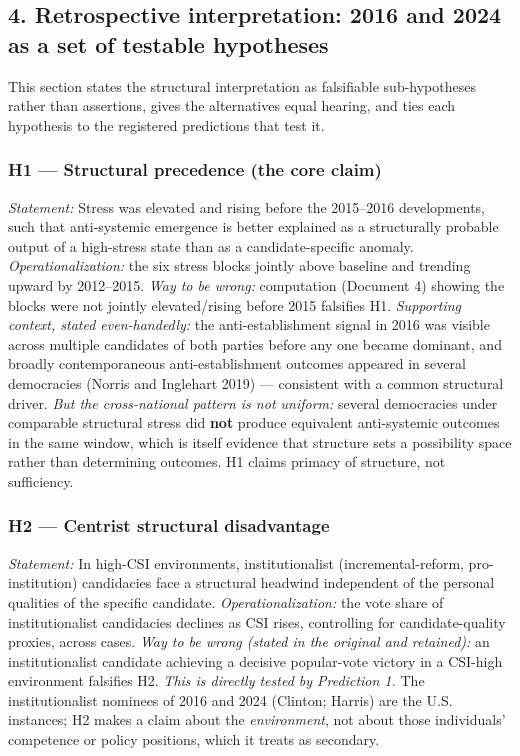 \documentclass[
]{article}
\begin{document}
\subsection{4. Retrospective interpretation: 2016 and 2024 as a set of
testable
hypotheses}\label{retrospective-interpretation-2016-and-2024-as-a-set-of-testable-hypotheses}

This section states the structural interpretation as falsifiable
sub-hypotheses rather than assertions, gives the alternatives equal
hearing, and ties each hypothesis to the registered predictions that
test it.

\subsubsection{H1 --- Structural precedence (the core
claim)}\label{h1-structural-precedence-the-core-claim}

\emph{Statement:} Stress was elevated and rising before the 2015--2016
developments, such that anti-systemic emergence is better explained as a
structurally probable output of a high-stress state than as a
candidate-specific anomaly. \emph{Operationalization:} the six stress
blocks jointly above baseline and trending upward by 2012--2015.
\emph{Way to be wrong:} computation (Document 4) showing the blocks were
not jointly elevated/rising before 2015 falsifies H1. \emph{Supporting
context, stated even-handedly:} the anti-establishment signal in 2016
was visible across multiple candidates of both parties before any one
became dominant, and broadly contemporaneous anti-establishment outcomes
appeared in several democracies (Norris and Inglehart 2019) ---
consistent with a common structural driver. \emph{But the cross-national
pattern is not uniform:} several democracies under comparable structural
stress did \textbf{not} produce equivalent anti-systemic outcomes in the
same window, which is itself evidence that structure sets a possibility
space rather than determining outcomes. H1 claims primacy of structure,
not sufficiency.

\subsubsection{H2 --- Centrist structural
disadvantage}\label{h2-centrist-structural-disadvantage}

\emph{Statement:} In high-CSI environments, institutionalist
(incremental-reform, pro-institution) candidacies face a structural
headwind independent of the personal qualities of the specific
candidate. \emph{Operationalization:} the vote share of institutionalist
candidacies declines as CSI rises, controlling for candidate-quality
proxies, across cases. \emph{Way to be wrong (stated in the original and
retained):} an institutionalist candidate achieving a decisive
popular-vote victory in a CSI-high environment falsifies H2. \emph{This
is directly tested by Prediction 1.} The institutionalist nominees of
2016 and 2024 (Clinton; Harris) are the U.S. instances; H2 makes a claim
about the \emph{environment}, not about those individuals' competence or
policy positions, which it treats as secondary.
\end{document}
